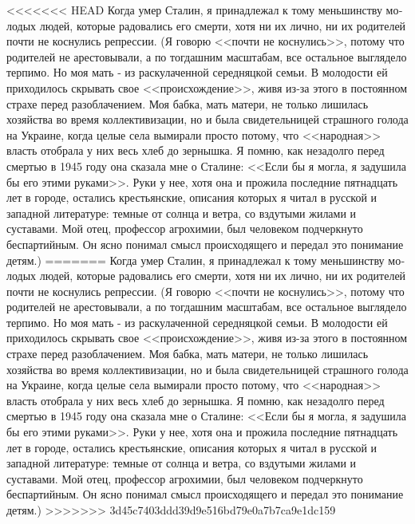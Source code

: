 \documentclass{book}
\begin{document}
{<<<<<<< HEAD
Когда умер Сталин, я принадлежал к тому меньшинству мо­лодых людей, которые радовались его смерти, хотя ни их лично, ни их родителей почти не коснулись репрессии. (Я говорю <<почти не коснулись>>, потому что родителей не арестовывали, а по тогдашним масштабам, все остальное выглядело терпимо. Но моя мать ‑ из раскулаченной середняцкой семьи. В молодости ей приходилось скрывать свое <<происхождение>>, живя из‑за этого в постоянном страхе перед разоблачением. Моя бабка, мать матери, не только лишилась хозяйства во время коллекти­визации, но и была свидетельницей страшного голода на Укра­ине, когда целые села вымирали просто потому, что <<народ­ная>> власть отобрала у них весь хлеб до зернышка. Я помню, как незадолго перед смертью в 1945 году она сказала мне о Сталине: <<Если бы я могла, я задушила бы его этими руками>>. Руки у нее, хотя она и прожила последние пятнадцать лет в го­роде, остались крестьянские, описания которых я читал в русской и западной литературе: темные от солнца и ветра, со вздутыми жилами и суставами. Мой отец, профессор агрохимии, был человеком подчеркнуто беспартийным. Он ясно понимал смысл происходящего и передал это понимание детям.)
=======
Когда умер Сталин, я принадлежал к тому меньшинству мо­лодых людей, которые радовались его смерти, хотя ни их лично, ни их родителей почти не коснулись репрессии. (Я говорю <<почти не коснулись>>, потому что родителей не арестовывали, а по тогдашним масштабам, все остальное выглядело терпимо. Но моя мать - из раскулаченной середняцкой семьи. В молодости ей приходилось скрывать свое <<происхождение>>, живя из-за этого в постоянном страхе перед разоблачением. Моя бабка, мать матери, не только лишилась хозяйства во время коллекти­визации, но и была свидетельницей страшного голода на Укра­ине, когда целые села вымирали просто потому, что <<народ­ная>> власть отобрала у них весь хлеб до зернышка. Я помню, как незадолго перед смертью в 1945 году она сказала мне о Сталине: <<Если бы я могла, я задушила бы его этими руками>>. Руки у нее, хотя она и прожила последние пятнадцать лет в го­роде, остались крестьянские, описания которых я читал в русской и западной литературе: темные от солнца и ветра, со вздутыми жилами и 
суставами. Мой отец, профессор агрохимии, был человеком подчеркнуто беспартийным. Он ясно понимал смысл происходящего и передал это понимание детям.)
>>>>>>> 3d45c7403ddd39d9e516bd79e0a7b7ca9e1dc159

}
\end{document}
